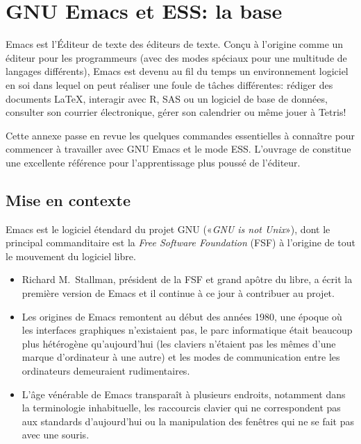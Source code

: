 \chapter{GNU Emacs et ESS: la base}
\label{emacs+ess}

Emacs est l'Éditeur de texte des éditeurs de texte. Conçu à l'origine
comme un éditeur pour les programmeurs (avec des modes spéciaux pour
une multitude de langages différents), Emacs est devenu au fil du
temps un environnement logiciel en soi dans lequel on peut réaliser
une foule de tâches différentes: rédiger des documents \LaTeX,
interagir avec R, SAS ou un logiciel de base de données, consulter son
courrier électronique, gérer son calendrier ou même jouer à Tetris!

Cette annexe passe en revue les quelques commandes essentielles à
connaître pour commencer à travailler avec GNU Emacs et le mode ESS.
L'ouvrage de \cite{Cameron:Emacs:2004} constitue une excellente
référence pour l'apprentissage plus poussé de l'éditeur.


\section{Mise en contexte}
\label{emacs+ess:contexte}

Emacs est le logiciel étendard du projet GNU («\emph{GNU is not
  Unix}»), dont le principal commanditaire est la \emph{Free Software
  Foundation} (FSF) à l'origine de tout le mouvement du logiciel
libre.
\begin{itemize}
\item Richard M.\ Stallman, président de la FSF et grand apôtre du
  libre, a écrit la première version de Emacs et il continue à ce jour
  à contribuer au projet.
\item Les origines de Emacs remontent au début des années 1980, une
  époque où les interfaces graphiques n'existaient pas, le parc
  informatique était beaucoup plus hétérogène qu'aujourd'hui (les
  claviers n'étaient pas les mêmes d'une marque d'ordinateur à une
  autre) et les modes de communication entre les ordinateurs
  demeuraient rudimentaires.
\item L'âge vénérable de Emacs transparaît à plusieurs endroits,
  notamment dans la terminologie inhabituelle, les raccourcis
  clavier qui ne correspondent pas aux standards d'aujourd'hui ou la
  manipulation des fenêtres qui ne se fait pas avec une souris.
\end{itemize}

